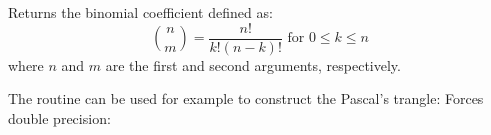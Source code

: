Returns the binomial coefficient defined as:
\begin{equation}
  \binom{n}{m} = \frac{n!}{k! (n-k)!} \text{ for } 0 \le k \le n
\end{equation}
where $n$ and $m$ are the first and second arguments, respectively.

The routine can be used for example to construct the Pascal's trangle:
Forces double precision:
\gdlimsldisclaimer
